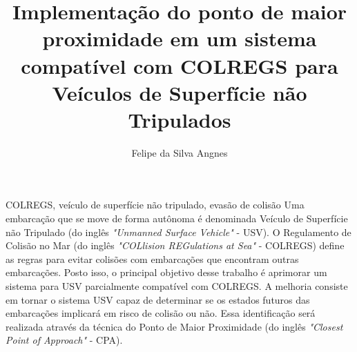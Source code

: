\documentclass[portuguese,oneside]{tcc}
\author{Felipe da Silva Angnes}
\title{Implementação do ponto de maior proximidade em um sistema compatível com COLREGS para Veículos de Superfície não Tripulados}
      {Closest Point of Approach implementation for a COLREGS compliant Unmanned Surface Vehicle system}
\begin{document}







\begin{resumo}{COLREGS, veículo de superfície não tripulado, evasão de colisão}
Uma embarcação que se move de forma autônoma é denominada Veículo de Superfície não Tripulado (do inglês \textit{"Unmanned Surface Vehicle"} - USV). O Regulamento de Colisão no Mar (do inglês \textit{"COLlision REGulations at Sea"} - COLREGS) define as regras para evitar colisões com embarcações que encontram outras embarcações. Posto isso, o principal objetivo desse trabalho é aprimorar um sistema para USV parcialmente compatível com COLREGS. A melhoria consiste em tornar o sistema USV capaz de determinar se os estados futuros das embarcações implicará em risco de colisão ou não. Essa identificação será realizada através da técnica do Ponto de Maior Proximidade (do inglês \textit{"Closest Point of Approach"} - CPA).
\end{resumo}
\end{document}
